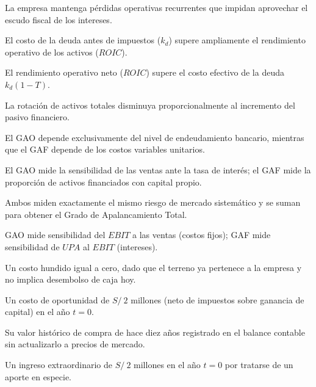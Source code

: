 \begin{opts}
    \item La empresa mantenga pérdidas operativas recurrentes que impidan aprovechar el escudo fiscal de los intereses.
    \item El costo de la deuda antes de impuestos ($k_d$) supere ampliamente el rendimiento operativo de los activos ($ROIC$).
    \item El rendimiento operativo neto ($ROIC$) supere el costo efectivo de la deuda $k_d(1 - T)$.
    \item La rotación de activos totales disminuya proporcionalmente al incremento del pasivo financiero.
\end{opts}

\begin{opts}
    \item El GAO depende exclusivamente del nivel de endeudamiento bancario, mientras que el GAF depende de los costos variables unitarios.
    \item El GAO mide la sensibilidad de las ventas ante la tasa de interés; el GAF mide la proporción de activos financiados con capital propio.
    \item Ambos miden exactamente el mismo riesgo de mercado sistemático y se suman para obtener el Grado de Apalancamiento Total.
    \item GAO mide sensibilidad del $EBIT$ a las ventas (costos fijos); GAF mide sensibilidad de $UPA$ al $EBIT$ (intereses).
\end{opts}

\begin{opts}
    \item Un costo hundido igual a cero, dado que el terreno ya pertenece a la empresa y no implica desembolso de caja hoy.
    \item Un costo de oportunidad de $S/\ 2$ millones (neto de impuestos sobre ganancia de capital) en el año $t = 0$.
    \item Su valor histórico de compra de hace diez años registrado en el balance contable sin actualizarlo a precios de mercado.
    \item Un ingreso extraordinario de $S/\ 2$ millones en el año $t = 0$ por tratarse de un aporte en especie.
\end{opts}

